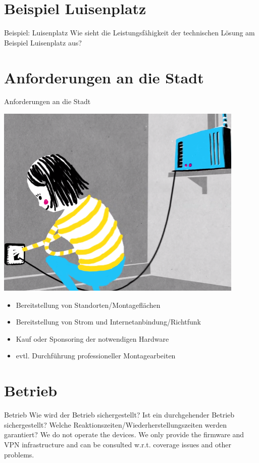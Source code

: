 \documentclass{beamer}
\begin{document}
\section{Beispiel Luisenplatz}
\begin{frame}{Beispiel: Luisenplatz}
Wie sieht die Leistungsfähigkeit der technischen Lösung am Beispiel Luisenplatz aus?
\end{frame}

\section{Anforderungen an die Stadt}
\begin{frame}{Anforderungen an die Stadt}
\vfill
\begin{center}
\includegraphics[height=0.4\textheight]{images/setup}$\;$
\vfill
\end{center}
\begin{itemize}
\item Bereitstellung von Standorten/Montageflächen
\item Bereitstellung von Strom und Internetanbindung/Richtfunk
\item Kauf oder Sponsoring der notwendigen Hardware
\item evtl. Durchführung professioneller Montagearbeiten
\end{itemize}
\vfill
\end{frame}

\section{Betrieb}
\begin{frame}{Betrieb}
Wie wird der Betrieb sichergestellt?
Ist ein durchgehender Betrieb sichergestellt?
Welche Reaktionszeiten/Wiederherstellungszeiten werden garantiert?
\vfill
We do not operate the devices. We only provide the firmware and VPN infrastructure and can be consulted w.r.t. coverage issues and other problems.
\end{frame}
\end{document}
